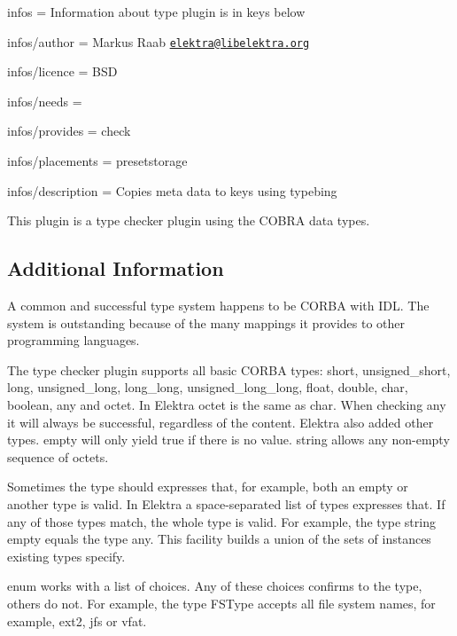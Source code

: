 
\begin{DoxyItemize}
\item infos = Information about type plugin is in keys below
\item infos/author = Markus Raab \href{mailto:elektra@libelektra.org}{\tt elektra@libelektra.\+org}
\item infos/licence = B\+S\+D
\item infos/needs =
\item infos/provides = check
\item infos/placements = presetstorage
\item infos/description = Copies meta data to keys using typebing
\end{DoxyItemize}

This plugin is a type checker plugin using the {\ttfamily C\+O\+B\+R\+A} data types.

\subsection*{Additional Information}

A common and successful type system happens to be C\+O\+R\+B\+A with I\+D\+L. The system is outstanding because of the many mappings it provides to other programming languages.

The type checker plugin supports all basic C\+O\+R\+B\+A types\+: {\ttfamily short}, {\ttfamily unsigned\+\_\+short}, {\ttfamily long}, {\ttfamily unsigned\+\_\+long}, {\ttfamily long\+\_\+long}, {\ttfamily unsigned\+\_\+long\+\_\+long}, {\ttfamily float}, {\ttfamily double}, {\ttfamily char}, {\ttfamily boolean}, {\ttfamily any} and {\ttfamily octet}. In Elektra {\ttfamily octet} is the same as {\ttfamily char}. When checking any it will always be successful, regardless of the content. Elektra also added other types. {\ttfamily empty} will only yield true if there is no value. {\ttfamily string} allows any non-\/empty sequence of octets.

Sometimes the type should expresses that, for example, both an empty or another type is valid. In Elektra a space-\/separated list of types expresses that. If any of those types match, the whole type is valid. For example, the type {\ttfamily string empty} equals the type {\ttfamily any}. This facility builds a union of the sets of instances existing types specify.

{\ttfamily enum} works with a list of choices. Any of these choices confirms to the type, others do not. For example, the type F\+S\+Type accepts all file system names, for example, ext2, jfs or vfat.

